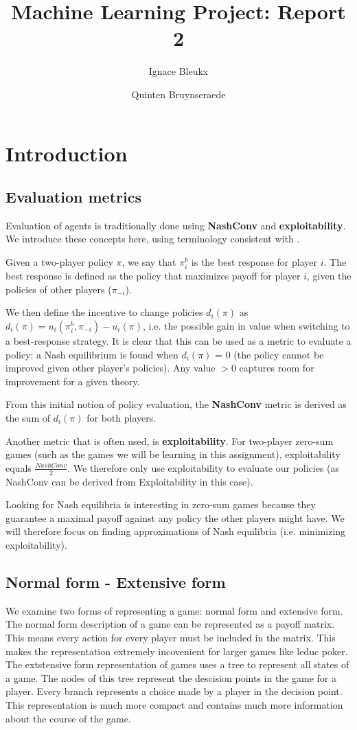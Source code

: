 \documentclass[10pt,a4paper]{article}
\title{Machine Learning Project: Report 2}
\author{Ignace Bleukx \and Quinten Bruynseraede}
\begin{document}
\maketitle
\section{Introduction}
\subsection{Evaluation metrics}
Evaluation of agents is traditionally done using \textbf{NashConv} and \textbf{exploitability}. We introduce these concepts here, using terminology consistent with \citeauthor{lanctot2019openspiel} \citep{lanctot2019openspiel}.

Given a two-player policy $\pi$, we say that $\pi^{b}_{i}$ is the best response for player $i$. The best response is defined as the policy that maximizes payoff for player $i$, given the policies of other players ($\pi_{-i}$). 

We then define the incentive to change policies $d_{i}(\pi)$ as $d_{i}(\pi) = u_{i}(\pi^{b}_{i},\pi_{-i}) - u_{i}(\pi)$, i.e. the possible gain in value when switching to a best-response strategy. It is clear that this can be used as a metric to evaluate a policy: a Nash equilibrium is found when $d_{i}(\pi)$ = 0 (the policy cannot be improved given other player's policies). Any value $>0$ captures room for improvement for a given theory. 

From this initial notion of policy evaluation, the \textbf{NashConv} metric is derived as the sum of $d_{i}(\pi)$ for both players.

Another metric that is often used, is \textbf{exploitability}. For two-player zero-sum games (such as the games we will be learning in this assignment), exploitability equals $\frac{NashConv}{2}$. We therefore only use exploitability to evaluate our policies (as NashConv can be derived from Exploitability in this case).

Looking for Nash equilibria is interesting in zero-sum games because they guarantee a maximal payoff against any policy the other players might have. We will therefore focus on finding approximations of Nash equilibria (i.e. minimizing exploitability). 

\subsection{Normal form - Extensive form}
We examine two forms of representing a game: normal form and extensive form. The normal form description of a game can be represented as a payoff matrix. This means every action for every player must be included in the matrix. This makes the representation extremely incovenient for larger games like leduc poker.
The extstensive form representation of games uses a tree to represent all states of a game. The nodes of this tree represent the descision points in the game for a player. Every branch represents a choice made by a player in the decision point. This representation is much more compact and contains much more information about the course of the game.
\end{document}
